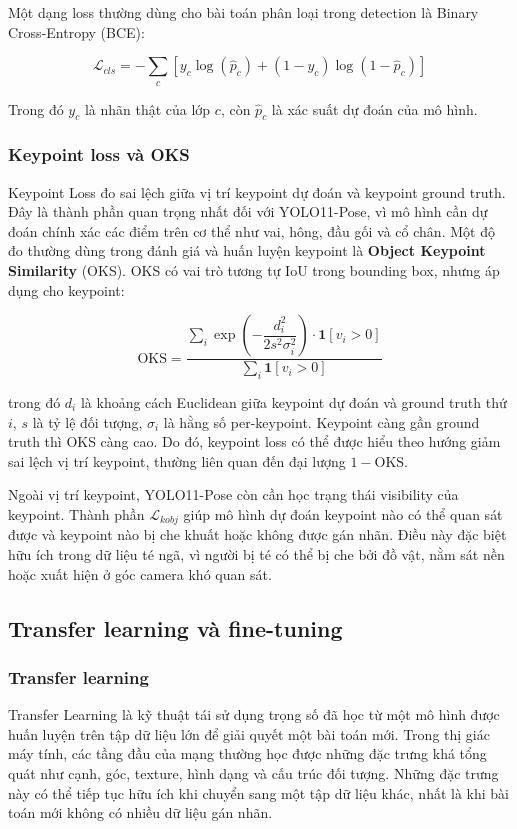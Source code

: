 \documentclass[12pt, a4paper]{article}
\begin{document}
Một dạng loss thường dùng cho bài toán phân loại trong detection là Binary Cross-Entropy (BCE):

\begin{equation}
  \mathcal{L}_{cls} = -\sum_{c} \left[ y_c \log(\hat{p}_c) + (1 - y_c)\log(1 - \hat{p}_c) \right]
\end{equation}

Trong đó $y_c$ là nhãn thật của lớp $c$, còn $\hat{p}_c$ là xác suất dự đoán của mô hình.

\subsubsection{Keypoint loss và OKS}
Keypoint Loss đo sai lệch giữa vị trí keypoint dự đoán và keypoint ground truth.
Đây là thành phần quan trọng nhất đối với YOLO11-Pose, vì mô hình cần dự đoán chính xác các điểm trên cơ thể như vai, hông, đầu gối và cổ chân.
Một độ đo thường dùng trong đánh giá và huấn luyện keypoint là \textbf{Object Keypoint Similarity} (OKS).
OKS có vai trò tương tự IoU trong bounding box, nhưng áp dụng cho keypoint:

\begin{equation}
  \text{OKS} = \frac{\sum_i \exp\!\left(-\dfrac{d_i^2}{2s^2\sigma_i^2}\right) \cdot \mathbf{1}[v_i > 0]}{\sum_i \mathbf{1}[v_i > 0]}
  \label{eq:oks}
\end{equation}

trong đó $d_i$ là khoảng cách Euclidean giữa keypoint dự đoán và ground truth thứ $i$, $s$ là tỷ lệ đối tượng, $\sigma_i$ là hằng số per-keypoint.
Keypoint càng gần ground truth thì OKS càng cao.
Do đó, keypoint loss có thể được hiểu theo hướng giảm sai lệch vị trí keypoint, thường liên quan đến đại lượng $1 - \text{OKS}$.

Ngoài vị trí keypoint, YOLO11-Pose còn cần học trạng thái visibility của keypoint.
Thành phần $\mathcal{L}_{kobj}$ giúp mô hình dự đoán keypoint nào có thể quan sát được và keypoint nào bị che khuất hoặc không được gán nhãn.
Điều này đặc biệt hữu ích trong dữ liệu té ngã, vì người bị té có thể bị che bởi đồ vật, nằm sát nền hoặc xuất hiện ở góc camera khó quan sát.

\subsection{Transfer learning và fine-tuning}

\subsubsection{Transfer learning}
Transfer Learning là kỹ thuật tái sử dụng trọng số đã học từ một mô hình được huấn luyện trên tập dữ liệu lớn để giải quyết một bài toán mới.
Trong thị giác máy tính, các tầng đầu của mạng thường học được những đặc trưng khá tổng quát như cạnh, góc, texture, hình dạng và cấu trúc đối tượng.
Những đặc trưng này có thể tiếp tục hữu ích khi chuyển sang một tập dữ liệu khác, nhất là khi bài toán mới không có nhiều dữ liệu gán nhãn.
\end{document}
